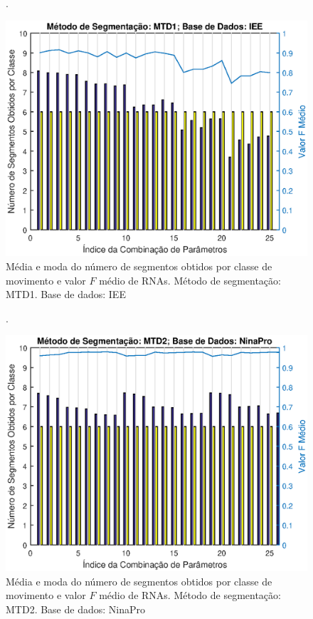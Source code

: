\begin{figure}[htb]
	\caption{\label{fig:mtd1Iee}Média e moda do número de segmentos obtidos por classe de movimento e valor $F$ médio de RNAs. Método de segmentação: MTD1. Base de dados: IEE}.
	\begin{center}
	    \includegraphics[width=0.75\linewidth]{./img/matlab/results/mtd1_iee.eps}
	\end{center}
\end{figure}

\begin{figure}[htb]
	\caption{\label{fig:mtd2Nina}Média e moda do número de segmentos obtidos por classe de movimento e valor $F$ médio de RNAs. Método de segmentação: MTD2. Base de dados: NinaPro}.
	\begin{center}
	    \includegraphics[width=0.75\linewidth]{./img/matlab/results/mtd2_nina.eps}
	\end{center}
\end{figure}

